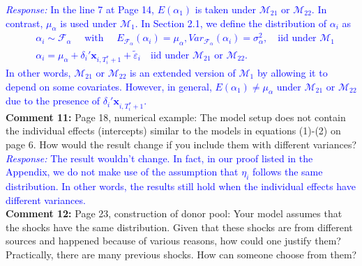 \documentclass[12pt]{article}
\newcommand{\response}[1]{\noindent \textcolor{blue}{\emph{Response:} #1}}
\begin{document}
{\response{In the line 7 at Page 14, $E(\alpha_1)$ is taken under $\mathcal{M}_{21}$ or $\mathcal{M}_{22}$. In contrast, $\mu_{\alpha}$ is used under $\mathcal{M}_{1}$. In Section 2.1, we define the distribution of $\alpha_i$ as
\begin{align*}
  &\alpha_i \sim \mathcal{F}_{\alpha} 
 \quad  \text{ with }\quad  E_{\mathcal{F}_{\alpha}}(\alpha_i) =\mu_{\alpha}, Var_{\mathcal{F}_{\alpha}}(\alpha_i)=\sigma^2_{\alpha},\quad   \text{iid under } \mathcal{M}_1\\
 & \alpha_i = \mu_{\alpha} +\delta_i'\mathbf{x}_{i, T_i^*+1} + \tilde{\varepsilon}_i\quad  \text{iid under } \mathcal{M}_{21} \text{ or } \mathcal{M}_{22}.
\end{align*}
In other words,  $\mathcal{M}_{21}$  or $\mathcal{M}_{22}$ is an extended version of $\mathcal{M}_{1}$ by allowing it to depend on some covariates. However, in general, $E(\alpha_1)\neq \mu_{\alpha}$ under   $\mathcal{M}_{21}$  or $\mathcal{M}_{22}$ due to the presence of $\delta_i'\mathbf{x}_{i, T_i^*+1}$.} \\

{\bf Comment 11:} Page 18, numerical example: The model setup does not contain the individual effects (intercepts) similar to the models in equations (1)-(2) on page 6. How would the result change if you include them with different variances? \\

\response{The result wouldn't change. In fact, in our proof listed in the Appendix, we do not make use of the assumption that $\eta_i$ follows the same distribution. In other words, the results  still hold when the individual effects have different variances.}\\


{\bf Comment 12:} Page 23, construction of donor pool: Your model assumes that the shocks have the same distribution. Given that these shocks are from different sources and happened because of various reasons, how could one justify them? Practically, there are many previous shocks. How can someone choose from them?\\


}
\end{document}
